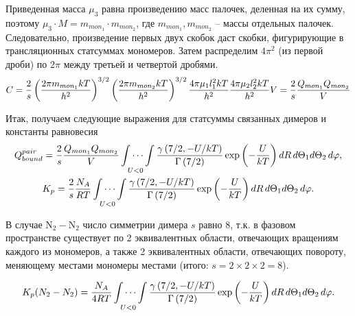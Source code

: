 \documentclass[12pt]{article}
\newcommand{\lb}{\left(}
\newcommand{\rb}{\right)}
\begin{document}
Приведенная масса $\mu_3$ равна произведению масс палочек, деленная на их сумму, поэтому $\mu_3 \cdot M = m_{mon_1} \cdot m_{mon_2}$, где $m_{mon_1}, m_{mon_2}$ -- массы отдельных палочек. Следовательно, произведение первых двух скобок даст скобки, фигурирующие в трансляционных статсуммах мономеров. Затем распределим $4 \pi^2$ (из первой дроби) по $2 \pi$ между третьей и четвертой дробями.
\begin{gather}
		C = \frac{2}{s} \lb \frac{2 \pi m_{mon_1} k T}{h^2} \rb^{3/2} \lb \frac{2 \pi m_{mon_2} k T}{h^2} \rb^{3/2} \frac{4 \pi \mu_1 l_1^2 k T}{h^2} \frac{4 \pi \mu_2 l_2^2 k T}{h^2} V = \frac{2}{s} \frac{Q_{mon_1} Q_{mon_2}}{V} \notag
\end{gather}

Итак, получаем следующие выражения для статсуммы связанных димеров и константы равновесия 
\begin{gather}
		Q_{bound}^{pair} = \frac{2}{s} \frac{Q_{mon_1} Q_{mon_2}}{V} \idotsint\limits_{U < 0} \frac{\gamma \lb 7/2, - U/kT \rb}{\Gamma \lb 7/2 \rb} \exp \lb - \frac{U}{kT} \rb d R \, d \Theta_1 d \Theta_2 \, d \varphi, \notag \\     
		K_p = \frac{2}{s} \frac{N_A}{R T} \idotsint\limits_{U < 0} \frac{\gamma \lb 7/2, - U/kT \rb}{\Gamma \lb 7/2 \rb} \exp \lb - \frac{U}{kT} \rb d R \, d \Theta_1 d \Theta_2 \, d \varphi. \notag 
\end{gather}

В случае N$_2-$N$_2$ число симметрии димера $s$ равно 8, т.к. в фазовом пространстве существует по 2 эквивалентных области, отвечающих вращениям каждого из мономеров, а также 2 эквивалентных области, отвечающих повороту, меняющему местами мономеры местами (итого: $s = 2 \times 2 \times 2 = 8$).  

\begin{gather}
		K_p (N_2-N_2) = \frac{N_A}{4 R T} \idotsint\limits_{U < 0} \frac{\gamma \lb 7/2, - U/kT \rb}{\Gamma \lb 7/2 \rb} \exp \lb - \frac{U}{kT} \rb d R \, d \Theta_1 d \Theta_2 \, d \varphi. \notag 
\end{gather}
\end{document}
